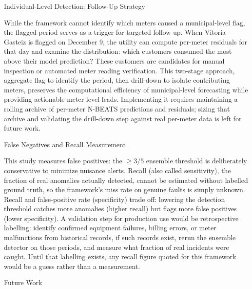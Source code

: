 ﻿\documentclass[12pt,reqno, twoside]{amsbook}
\makeatletter
\numberwithin{figure}{chapter}
\numberwithin{table}{chapter}
\numberwithin{equation}{chapter}
\def\section{\@startsection{section}{1}%
      \z@{.5\linespacing\@plus.7\linespacing}{.25\linespacing}%
      {\normalfont\bfseries\flushleft}}
\def\subsection{\@startsection{subsection}{2}%
      \z@{.5\linespacing\@plus.7\linespacing}{.25\linespacing}%
      {\normalfont\bfseries\flushleft}}
\theoremstyle{plain}
\numberwithin{equation}{chapter}
\numberwithin{section}{chapter}
\makeatother
\begin{document}
\subsection{Individual-Level Detection: Follow-Up Strategy}
\label{subsec:individual_level}

While the framework cannot identify which meters caused a municipal-level flag, the flagged period serves as a trigger for targeted follow-up. When Vitoria-Gasteiz is flagged on December 9, the utility can compute per-meter residuals for that day and examine the distribution: which customers consumed the most above their model prediction? These customers are candidates for manual inspection or automated meter reading verification. This two-stage approach, aggregate flag to identify the period, then drill-down to isolate contributing meters, preserves the computational efficiency of municipal-level forecasting while providing actionable meter-level leads. Implementing it requires maintaining a rolling archive of per-meter N-BEATS predictions and residuals; sizing that archive and validating the drill-down step against real per-meter data is left for future work.

\subsection{False Negatives and Recall Measurement}

This study measures false positives: the $\geq 3/5$ ensemble threshold is deliberately conservative to minimize nuisance alerts. Recall (also called sensitivity), the fraction of real anomalies actually detected, cannot be estimated without labelled ground truth, so the framework's miss rate on genuine faults is simply unknown. Recall and false-positive rate (specificity) trade off: lowering the detection threshold catches more anomalies (higher recall) but flags more false positives (lower specificity). A validation step for production use would be retrospective labelling: identify confirmed equipment failures, billing errors, or meter malfunctions from historical records, if such records exist, rerun the ensemble detector on those periods, and measure what fraction of real incidents were caught. Until that labelling exists, any recall figure quoted for this framework would be a guess rather than a measurement.

\section{Future Work}
\end{document}
